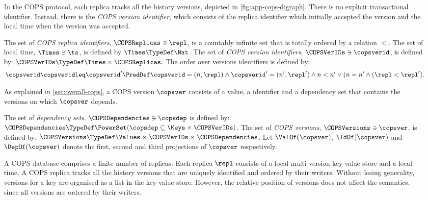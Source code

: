 In the COPS protocol, 
each replica tracks all the history versions, depicted in \cref{fig:app-cops-digraph}.
There is no explicit transactional identifier.
Instead, there is the \emph{COPS version identifier},
which consists of the replica identifier which initially accepted the version 
and the local time when the version was accepted.



\begin{definition}
\label{fig:cops-ver-id}
The set of \emph{COPS replica identifiers}, \( \COPSReplicas \ni \repl \), 
is a countably infinite set that is totally ordered by a relation \( < \).
The set of local time, \( \Times \ni \ts\), is defined by \( \Times \TypeDef \Nat \).
The set of \emph{COPS version identifiers}, \( \COPSVerIDs \ni \copsverid \),
is defined by: \( \COPSVerIDs \TypeDef \Times \times \COPSReplicas .  \)
The order over versions identifiers is defined by:
\[ 
\copsverid \copsveridleq \copsverid'
\PredDef 
\copsverid = (n,\repl)
\land \copsverid' = (n',\repl')
\land n < n' \lor ( n = n' \land ( \repl < \repl' ) .
\]
\end{definition}

As explained in \cref{sec:overall-cops},
a COPS version \( \copsver \) consists of a value, a identifier 
and a dependency set that contains the versions on which \( \copsver \) depends.

\begin{definition}
The set of \emph{dependency sets}, \( \COPSDependencies \ni \copsdep \) 
is defined by: \( \COPSDependencies \TypeDef \PowerSet(\copsdep \subseteq \Keys \times \COPSVerIDs) \).
The set of \emph{COPS versions}, \( \COPSVersions \ni \copsver \), is defined by: 
\( \COPSVersions \TypeDef \Values \times \COPSVerIDs  \times \COPSDependencies \).
Let \(\ValOf(\copsver)\), \(\IdOf(\copsver)\)  
and \( \DepOf(\copsver)\) denote the first, second and third projections of \( \copsver \) respectively.
\end{definition}

A COPS database comprises a finite number of replicas.
Each replica \( \repl \) consists of a local multi-version key-value store and a local time.
A COPS replica tracks all the history versions that are uniquely identified and ordered by their writers.
Without losing generality, versions for a key are organised as a list in the key-value store.
However, the relative position of versions does not affect the semantics, since all versions are ordered by their writers.

